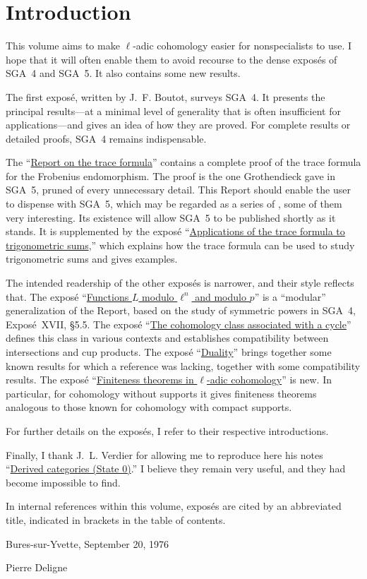 
\chapter*{Introduction}

This volume aims to make $\ell$-adic cohomology easier for nonspecialists to
use. I hope that it will often enable them to avoid recourse to the dense
expos\'es of SGA~4 and SGA~5. It also contains some new results.

The first expos\'e, written by J.~F. Boutot, surveys SGA~4. It presents the
principal results---at a minimal level of generality that is often
insufficient for applications---and gives an idea of how they are proved. For
complete results or detailed proofs, SGA~4 remains indispensable.

The ``\hyperref[II]{Report on the trace formula}'' contains a complete proof of the trace formula for the
Frobenius endomorphism. The proof is the one Grothendieck gave in SGA~5,
pruned of every unnecessary detail. This Report should enable the user to
dispense with SGA~5, which may be regarded as a series of , some of
them very interesting. Its existence will allow SGA~5 to be published shortly
as it stands. It is supplemented by the expos\'e ``\hyperref[VI]{Applications of the trace formula to trigonometric sums},'' which
explains how the trace formula can be used to study trigonometric sums and
gives examples.

The intended readership of the other expos\'es is narrower, and their style
reflects that. The expos\'e ``\hyperref[III]{Functions $L$ modulo $\ell^n$ and modulo $p$}'' is a ``modular'' generalization
of the Report, based on the study of symmetric powers in SGA~4, Expos\'e~XVII,
\S5.5. The expos\'e ``\hyperref[IV]{The cohomology class associated with a cycle}'' defines this class in various contexts
and establishes compatibility between intersections and cup products. The
expos\'e ``\hyperref[V]{Duality}'' brings together some known results for which a
reference was lacking, together with some compatibility results. The expos\'e
``\hyperref[VII]{Finiteness theorems in $\ell$-adic cohomology}'' is new. In particular, for cohomology without supports it
gives finiteness theorems analogous to those known for cohomology with compact
supports.

For further details on the expos\'es, I refer to their respective
introductions.

Finally, I thank J.~L. Verdier for allowing me to reproduce here his notes
``\hyperref[VIII]{Derived categories (State 0)}.'' I believe they remain very useful, and they had become
impossible to find.

In internal references within this volume, expos\'es are cited by an
abbreviated title, indicated in brackets in the table of contents.

\vspace{20pt}
Bures-sur-Yvette, September 20, 1976

\vspace{5pt}
Pierre Deligne

